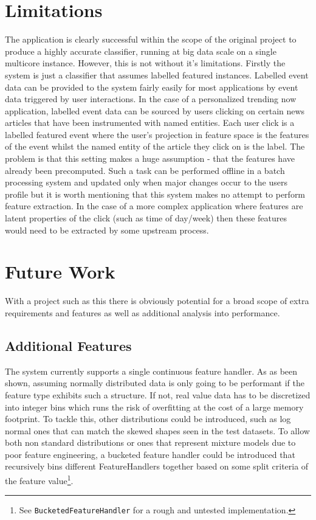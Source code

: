 \documentclass[a4paper,11pt]{scrreprt}
\begin{document}
\section{Limitations}
The application is clearly successful within the scope of the original project to produce a highly accurate classifier, running at big data scale on a single multicore instance. However, this is not without it's limitations. Firstly the system is just a classifier that assumes labelled featured instances. Labelled event data can be provided to the system fairly easily for most applications by event data triggered by user interactions. In the case of a personalized trending now application, labelled event data can be sourced by users clicking on certain news articles that have been instrumented with named entities. Each user click is a labelled featured event where the user's projection in feature space is the features of the event whilst the named entity of the article they click on is the label. The problem is that this setting makes a huge assumption - that the features have already been precomputed. Such a task can be performed offline in a batch processing system and updated only when major changes occur to the users profile but it is worth mentioning that this system makes no attempt to perform feature extraction. In the case of a more complex application where features are latent properties of the click (such as time of day/week) then these features would need to be extracted by some upstream process. 
\section{Future Work}
With a project such as this there is obviously potential for a broad scope of extra requirements and features as well as additional analysis into performance. 
\subsection{Additional Features}
The system currently supports a single continuous feature handler. As as been shown, assuming normally distributed data is only going to be performant if the feature type exhibits such a structure. If not, real value data has to be discretized into integer bins which runs the risk of overfitting at the cost of a large memory footprint. To tackle this, other distributions could be introduced, such as log normal ones that can match the skewed shapes seen in the test datasets. To allow both non standard distributions or ones that represent mixture models due to poor feature engineering, a bucketed feature handler could be introduced that recursively bins different FeatureHandlers together based on some split criteria of the feature value\footnote{See \verb|BucketedFeatureHandler| for a rough and untested implementation.}. \
\end{document}
